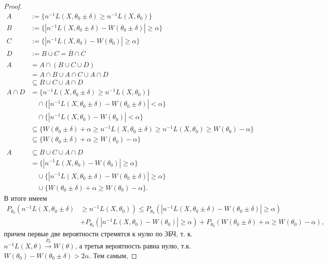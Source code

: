 \begin{proof}
    \begingroup
    \allowdisplaybreaks
    \begin{align}
    A&:=\{n^{-1}L(X,\theta_{0}\pm\delta)\geq n^{-1}L(X,\theta_{0})\}\\B&:=\{|n^{-1}L(X,\theta_{0}\pm\delta)-W(\theta_{0}\pm\delta)|\geq\alpha\}\\C&:=\{|n^{-1}L(X,\theta_{0})-W(\theta_{0})|\geq\alpha\}\\D&:=\overline{B\cup C}=\overline{B}\cap\overline{C}\\&\\A&=A\cap(B\cup C\cup D)\\&=A\cap B\cup A\cap C\cup A\cap D\\&\subseteq B\cup C\cup A\cap D\\A\cap D&=\{n^{-1}L(X,\theta_{0}\pm\delta)\geq n^{-1}L(X,\theta_{0})\}\\&\quad\cap\{|n^{-1}L(X,\theta_{0}\pm\delta)-W(\theta_{0}\pm\delta)|<\alpha\}\\&\quad\cap\{|n^{-1}L(X,\theta_{0})-W(\theta_{0})|<\alpha\}\\&\subseteq\{W(\theta_{0}\pm\delta)+\alpha\ge n^{-1}L(X,\theta_{0}\pm\delta)\geq n^{-1}L(X,\theta_{0})\ge W(\theta_{0})-\alpha\}\\&\subseteq\{W(\theta_{0}\pm\delta)+\alpha\ge W(\theta_{0})-\alpha\}\\&\\A&\subseteq B\cup C\cup A\cap D\\&=\{|n^{-1}L(X,\theta_{0})-W(\theta_{0})|\geq\alpha\}\\&\quad\cup\{|n^{-1}L(X,\theta_{0}\pm\delta)-W(\theta_{0}\pm\delta)|\geq\alpha\}\\&\quad\cup\{W(\theta_{0}\pm\delta)+\alpha\ge W(\theta_{0})-\alpha\}.
    \end{align}
    \endgroup
    В итоге имеем
    $$
    \begin{aligned}
    P_{\theta_{0}}\left(n^{-1} L\left(X, \theta_{0} \pm \delta\right)\right.&\left.\geq n^{-1} L\left(X, \theta_{0}\right)\right) \leq P_{\theta_{0}}\left(\left|n^{-1} L\left(X, \theta_{0} \pm \delta\right)-W\left(\theta_{0} \pm \delta\right)\right| \geq \alpha\right) \\
    &+P_{\theta_{0}}\left(\left|n^{-1} L\left(X, \theta_{0}\right)-W\left(\theta_{0}\right)\right| \geq \alpha\right)+P_{\theta_{0}}\left(W\left(\theta_{0} \pm \delta\right)+\alpha \geq W\left(\theta_{0}\right)-\alpha\right),
    \end{aligned}
    $$
    причем первые две вероятности стремятся к нулю по ЗБЧ, т. к. $n^{-1} L\left(X, \theta\right) \xrightarrow{P_\theta} W\left(\theta\right)$, а третья вероятность равна нулю, т.к. $W\left(\theta_{0}\right)-W\left(\theta_{0} \pm \delta\right)>2 \alpha$. Тем самым,

\end{proof}
